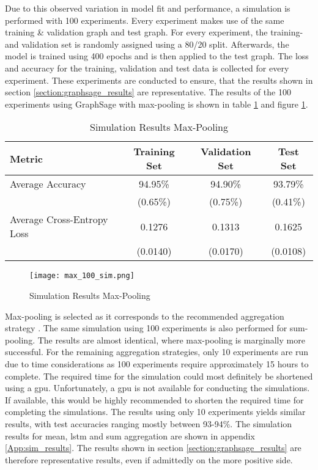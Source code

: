   \noindent Due to this observed variation in model fit and performance, a
  simulation is performed with 100 experiments. Every experiment makes use of
  the same training \& validation graph and test graph. For every experiment,
  the training- and validation set is randomly assigned using a 80/20 split.
  Afterwards, the model is trained using 400 epochs and is then applied to the
  test graph. The loss and accuracy for the training, validation and test data
  is collected for every experiment. These experiments are conducted to
  ensure, that the results shown in section \ref{section:graphsage_results} are
  representative. The results of the 100 experiments using GraphSage with
  max-pooling is shown in table \ref{table:simulation_results} and figure 
  \ref{fig:simulation_results}. 

  \begin{table}[h]
    \centering
      \begin{tabular}{|l||c|c|c|}
      \hline
      \textbf{Metric} & \textbf{Training Set} & \textbf{Validation Set} & 
      \textbf{Test Set}\\
      \hline\hline
      Average Accuracy & 94.95\% & 94.90\% & 93.79\% \\\hline 
                       & (0.65\%) & (0.75\%) & (0.41\%) \\\hline
      Average Cross-Entropy Loss & 0.1276 & 0.1313 & 0.1625 \\\hline
                                 & (0.0140) & (0.0170) & (0.0108) \\
      \hline
    \end{tabular}
    \caption{Simulation Results Max-Pooling}
    \label{table:simulation_results}
  \end{table}

  \begin{figure}[htbp!]
		\centering
		\texttt{[image: max\_100\_sim.png]}
		\caption{Simulation Results Max-Pooling}
        \label{fig:simulation_results}
  \end{figure}

  \noindent Max-pooling is selected as it corresponds to the recommended
  aggregation strategy \citep[p. 9]{hamilton2017inductive}. The same simulation
  using 100 experiments is also performed for sum-pooling. The results are
  almost identical, where max-pooling is marginally more successful. For the 
  remaining aggregation strategies, only 10 experiments are run due to time
  considerations as 100 experiments require approximately 15 hours to complete.
  The required time for the simulation could most definitely be shortened using
  a \ac{gpu}. Unfortunately, a \acs{gpu} is not available for conducting the 
  simulations. If available, this would be highly recommended to shorten the 
  required time for completing the simulations. The results using only 10 
  experiments yields similar results, with test accuracies ranging mostly 
  between 93-94\%. The simulation results for mean, \acs{lstm} and sum aggregation 
  are shown in appendix \ref{App:sim_results}. The results shown in section 
  \ref{section:graphsage_results} are therefore representative results, even if 
  admittedly on the more positive side. 

